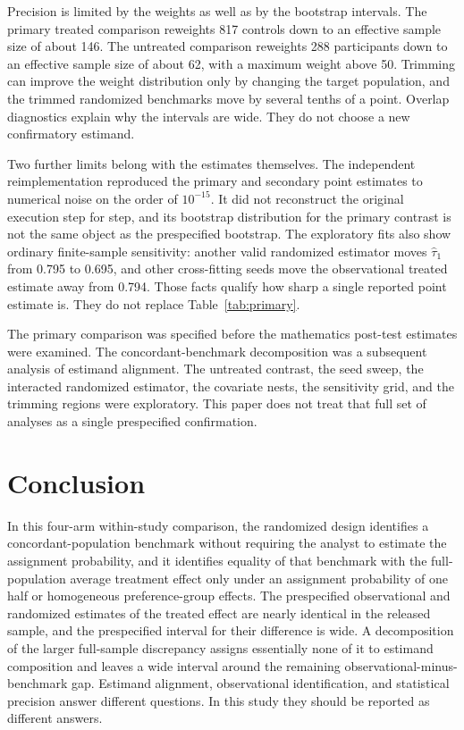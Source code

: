 \documentclass[11pt]{article}
\theoremstyle{remark}
\begin{document}
Precision is limited by the weights as well as by the bootstrap intervals. The primary treated comparison reweights 817 controls down to an effective sample size of about 146. The untreated comparison reweights 288 participants down to an effective sample size of about 62, with a maximum weight above 50. Trimming can improve the weight distribution only by changing the target population, and the trimmed randomized benchmarks move by several tenths of a point. Overlap diagnostics explain why the intervals are wide. They do not choose a new confirmatory estimand.

Two further limits belong with the estimates themselves. The independent reimplementation reproduced the primary and secondary point estimates to numerical noise on the order of $10^{-15}$. It did not reconstruct the original execution step for step, and its bootstrap distribution for the primary contrast is not the same object as the prespecified bootstrap. The exploratory fits also show ordinary finite-sample sensitivity: another valid randomized estimator moves $\widehat\tau_1$ from 0.795 to 0.695, and other cross-fitting seeds move the observational treated estimate away from 0.794. Those facts qualify how sharp a single reported point estimate is. They do not replace Table~\ref{tab:primary}.

The primary comparison was specified before the mathematics post-test estimates were examined. The concordant-benchmark decomposition was a subsequent analysis of estimand alignment. The untreated contrast, the seed sweep, the interacted randomized estimator, the covariate nests, the sensitivity grid, and the trimming regions were exploratory. This paper does not treat that full set of analyses as a single prespecified confirmation.

\section{Conclusion}
\label{sec:conclusion}

In this four-arm within-study comparison, the randomized design identifies a concordant-population benchmark without requiring the analyst to estimate the assignment probability, and it identifies equality of that benchmark with the full-population average treatment effect only under an assignment probability of one half or homogeneous preference-group effects. The prespecified observational and randomized estimates of the treated effect are nearly identical in the released sample, and the prespecified interval for their difference is wide. A decomposition of the larger full-sample discrepancy assigns essentially none of it to estimand composition and leaves a wide interval around the remaining observational-minus-benchmark gap. Estimand alignment, observational identification, and statistical precision answer different questions. In this study they should be reported as different answers.



\end{document}
